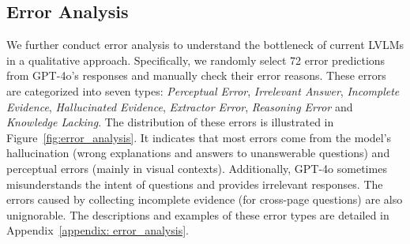 \subsection{Error Analysis}
We further conduct error analysis to understand the bottleneck of current LVLMs in a qualitative approach. Specifically, we randomly select 72 error predictions from GPT-4o's responses and manually check their error reasons. These errors are categorized into seven types: \textit{Perceptual Error}, \textit{Irrelevant Answer}, \textit{Incomplete Evidence}, \textit{Hallucinated Evidence}, \textit{Extractor Error}, \textit{Reasoning Error} and \textit{Knowledge Lacking}.
The distribution of these errors is illustrated in Figure~\ref{fig:error_analysis}. It indicates that most errors come from the model's hallucination (\ie wrong explanations and answers to unanswerable questions) and perceptual errors (mainly in visual contexts). Additionally, GPT-4o sometimes misunderstands the intent of questions and provides irrelevant responses. The errors caused by collecting incomplete evidence (for cross-page questions) are also unignorable. The descriptions and examples of these error types are detailed in Appendix~\ref{appendix: error_analysis}.



